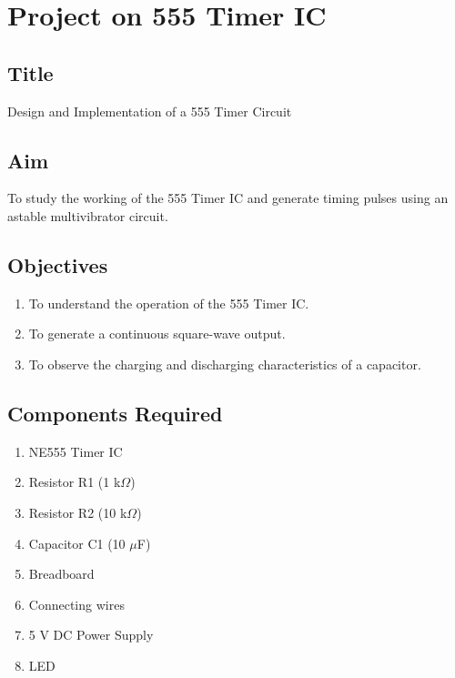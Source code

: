 \documentclass[12pt,a4paper]{report}
\begin{document}
\newpage



\chapter{Project on 555 Timer IC}

\section{Title}

Design and Implementation of a 555 Timer Circuit

\section{Aim}

To study the working of the 555 Timer IC and generate timing pulses using an astable multivibrator circuit.

\section{Objectives}

\begin{enumerate}
    \item To understand the operation of the 555 Timer IC.
    \item To generate a continuous square-wave output.
    \item To observe the charging and discharging characteristics of a capacitor.
\end{enumerate}

\section{Components Required}

\begin{enumerate}
    \item NE555 Timer IC
    \item Resistor R1 (1 k$\Omega$)
    \item Resistor R2 (10 k$\Omega$)
    \item Capacitor C1 (10 $\mu$F)
    \item Breadboard
    \item Connecting wires
    \item 5 V DC Power Supply
    \item LED
\end{enumerate}
\end{document}
